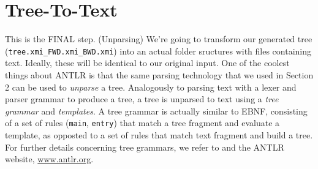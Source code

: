 \newpage
\hypertarget{finalStep}{}
\section{Tree-To-Text}
\genHeader

This is the FINAL step. (Unparsing)
We're going to transform our generated tree (\texttt{tree.xmi\_FWD.xmi\_BWD.xmi}) into an actual folder sructures with files containing text. Ideally, these
will be identical to our original input. One of the coolest things about ANTLR is that the same parsing technology that we used in Section 2 can be used to
\emph{unparse} a tree. Analogously to parsing text with a lexer and parser grammar to produce a tree, a tree is unparsed to text using a \emph{tree grammar} and
\emph{templates}. A tree grammar is actually similar to EBNF, consisting of a set of rules (\texttt{main}, \texttt{entry}) that match a tree fragment and evaluate a
template, as opposted to a set of rules that match text fragment and build a tree. For further details concerning tree grammars, we refer to \cite{ANTLR} and
the ANTLR website, \url{www.antlr.org}.

